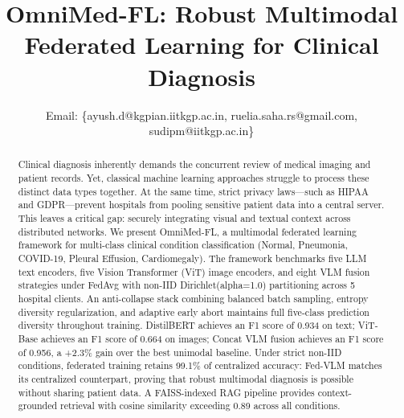 \documentclass[letterpaper, conference]{IEEEtran}
\begin{document}
\renewcommand{\arraystretch}{0.85}
\setlength{\abovecaptionskip}{0pt}
\setlength{\belowcaptionskip}{0pt}
\renewcommand{\dbltopfraction}{0.9}
\renewcommand{\topfraction}{0.9}

\title{OmniMed-FL: Robust Multimodal Federated Learning for Clinical Diagnosis}

\author{





Email: \{ayush.d@kgpian.iitkgp.ac.in, ruelia.saha.rs@gmail.com, sudipm@iitkgp.ac.in\}
}

\maketitle

\begin{abstract}
Clinical diagnosis inherently demands the concurrent review of medical imaging and patient records. Yet, classical machine learning approaches struggle to process these distinct data types together. At the same time, strict privacy laws---such as HIPAA and GDPR---prevent hospitals from pooling sensitive patient data into a central server. This leaves a critical gap: securely integrating visual and textual context across distributed networks. We present OmniMed-FL, a multimodal federated learning framework for multi-class clinical condition classification (Normal, Pneumonia, COVID-19, Pleural Effusion, Cardiomegaly). The framework benchmarks five LLM text encoders, five Vision Transformer (ViT) image encoders, and eight VLM fusion strategies under FedAvg with non-IID Dirichlet(alpha=1.0) partitioning across 5 hospital clients. An anti-collapse stack combining balanced batch sampling, entropy diversity regularization, and adaptive early abort maintains full five-class prediction diversity throughout training. DistilBERT achieves an F1 score of 0.934 on text; ViT-Base achieves an F1 score of 0.664 on images; Concat VLM fusion achieves an F1 score of 0.956, a +2.3\% gain over the best unimodal baseline. Under strict non-IID conditions, federated training retains 99.1\% of centralized accuracy: Fed-VLM matches its centralized counterpart, proving that robust multimodal diagnosis is possible without sharing patient data. A FAISS-indexed RAG pipeline provides context-grounded retrieval with cosine similarity exceeding 0.89 across all conditions.
\end{abstract}
\end{document}
